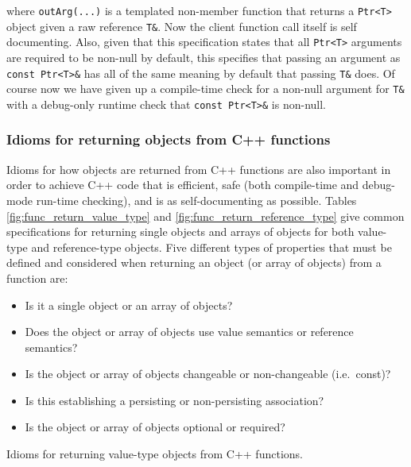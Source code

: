 \documentclass[pdf,ps2pdf,11pt]{SANDreport}
\begin{document}
where {}\texttt{outArg(...)} is a templated non-member function that
returns a {}\texttt{Ptr<T>} object given a raw reference
{}\texttt{T\&}.  Now the client function call itself is self
documenting.  Also, given that this specification states that all
{}\texttt{Ptr<T>} arguments are required to be non-null by default,
this specifies that passing an argument as {}\texttt{const Ptr<T>\&}
has all of the same meaning by default that passing {}\texttt{T\&}
does.  Of course now we have given up a compile-time check for a
non-null argument for {}\texttt{T\&} with a debug-only runtime check
that {}\texttt{const Ptr<T>\&} is non-null.


%
{}\subsubsection{Idioms for returning objects from C++ functions}
%

Idioms for how objects are returned from C++ functions are also
important in order to achieve C++ code that is efficient, safe (both
compile-time and debug-mode run-time checking), and is as
self-documenting as possible.  Tables
{}\ref{fig:func_return_value_type} and
{}\ref{fig:func_return_reference_type} give common specifications for
returning single objects and arrays of objects for both value-type and
reference-type objects.  Five different types of properties that must
be defined and considered when returning an object (or array of
objects) from a function are:

\begin{itemize}

{}\item Is it a single object or an array of objects?

{}\item Does the object or array of objects use value semantics or
reference semantics?

{}\item Is the object or array of objects changeable or non-changeable
(i.e.\ const)?

{}\item Is this establishing a persisting or non-persisting
association?

{}\item Is the object or array of objects optional or required?

\end{itemize}


\begin{table}[p]
%
\begin{center}
%
%

%
%
%
\end{center}
\caption{\label{fig:func_return_value_type}
Idioms for returning value-type objects from C++ functions.}
%
\end{table}
\end{document}
